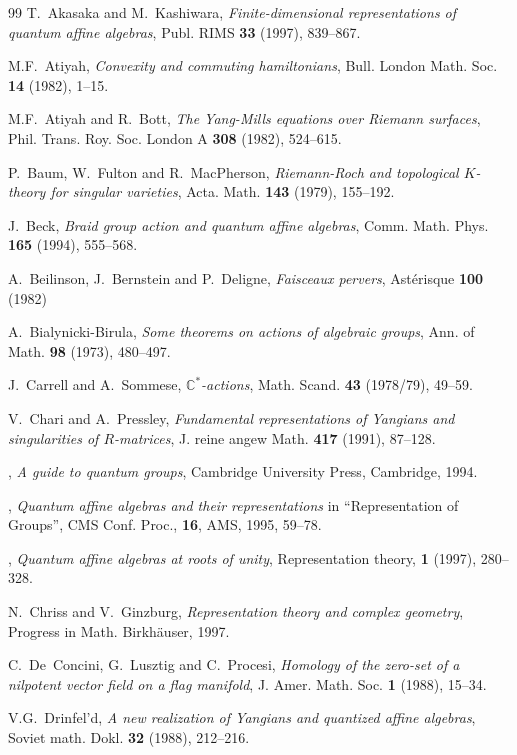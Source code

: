 \documentclass[12pt]{amsart}
\def\Bbb{\mathbb}
\theoremstyle{definition}
\theoremstyle{remark}
\numberwithin{equation}{subsection}
\newcommand{\C}{{\Bbb C}}
\begin{document}
\begin{thebibliography}{99}
 T.~Akasaka and M.~Kashiwara,
{\it Finite-dimensional representations of quantum affine algebras},
Publ. RIMS {\bf 33} (1997), 839--867.

 M.F.~Atiyah,
{\it Convexity and commuting hamiltonians},
Bull. London Math. Soc. {\bf 14} (1982), 1--15.

 M.F.~Atiyah and R.~Bott,
{\it The Yang-Mills equations over Riemann surfaces},
Phil. Trans. Roy. Soc. London A {\bf 308} (1982), 524--615.

 P.~Baum, W.~Fulton and R.~MacPherson,
{\it Riemann-Roch and topological $K$-theory for singular varieties},
Acta. Math. {\bf 143} (1979), 155--192.

 J.~Beck,
{\it Braid group action and quantum affine algebras},
Comm. Math. Phys. {\bf 165} (1994), 555--568.

 A.~Beilinson, J.~Bernstein and P.~Deligne,
{\it Faisceaux pervers},
Ast\'erisque {\bf 100} (1982)

 A.~Bialynicki-Birula,
{\it Some theorems on actions of algebraic groups},
Ann. of Math. {\bf 98} (1973), 480--497.

 J.~Carrell and A.~Sommese,
{\it $\C^*$-actions},
Math. Scand. {\bf 43} (1978/79), 49--59. 

 V.~Chari and A.~Pressley,
{\it Fundamental representations of Yangians and singularities of
$R$-matrices},
J. reine angew Math. {\bf 417} (1991), 87--128.

 \bysame,
{\it A guide to quantum groups},
Cambridge University Press, Cambridge, 1994.

 \bysame,
{\it Quantum affine algebras and their representations}
in ``Representation of Groups'', CMS Conf. Proc., {\bf 16}, AMS, 1995,
59--78.

 \bysame,
{\it Quantum affine algebras at roots of unity},
Representation theory, {\bf 1} (1997), 280--328.

 N.~Chriss and V.~Ginzburg,
{\it Representation theory and complex geometry},
 Progress in Math. Birkh\"auser, 1997.

 C.~De~Concini, G.~Lusztig and C.~Procesi,
{\it Homology of the zero-set of a nilpotent vector field on a flag
manifold},
J. Amer. Math. Soc. {\bf 1} (1988), 15--34.

 V.G.~Drinfel'd,
{\it A new realization of Yangians and quantized affine algebras},
Soviet math. Dokl. {\bf 32} (1988), 212--216.


\end{thebibliography}
\end{document}
